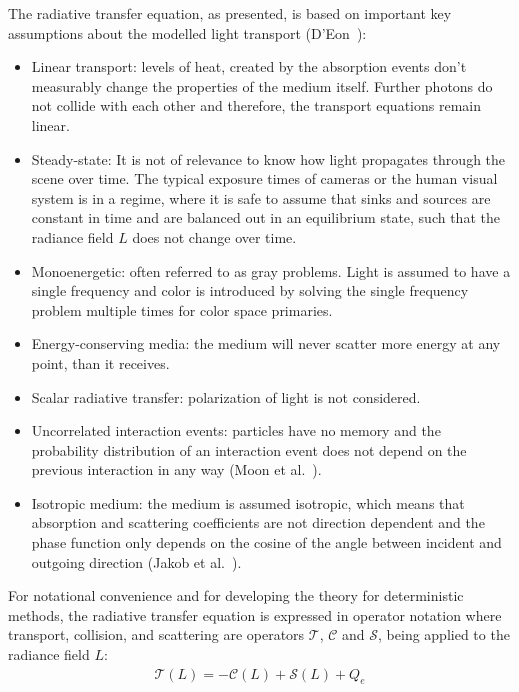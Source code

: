 The radiative transfer equation, as presented, is based on important key assumptions about the modelled light transport (D'Eon~\cite{DEon14}):
\begin{itemize}
\item Linear transport: levels of heat, created by the absorption events don't measurably change the properties of the medium itself. Further photons do not collide with each other and therefore, the transport equations remain linear.
\item Steady-state: It is not of relevance to know how light propagates through the scene over time. The typical exposure times of cameras or the human visual system is in a regime, where it is safe to assume that sinks and sources are constant in time and are balanced out in an equilibrium state, such that the radiance field $L$ does not change over time.
\item Monoenergetic: often referred to as gray problems. Light is assumed to have a single frequency and color is introduced by solving the single frequency problem multiple times for color space primaries.
\item Energy-conserving media: the medium will never scatter more energy at any point, than it receives.
\item Scalar radiative transfer: polarization of light is not considered.
\item Uncorrelated interaction events: particles have no memory and the probability distribution of an interaction event does not depend on the previous interaction in any way (Moon et al.~\cite{Moon07}).
\item Isotropic medium: the medium is assumed isotropic, which means that absorption and scattering coefficients are not direction dependent and the phase function only depends on the cosine of the angle between incident and outgoing direction (Jakob et al.~\cite{Jakob10}).
\end{itemize}

For notational convenience and for developing the theory for deterministic methods, the radiative transfer equation is expressed in operator notation where transport, collision, and scattering are operators $\mathcal{T}$, $\mathcal{C}$ and $\mathcal{S}$, being applied to the radiance field $L$:
\begin{align}
\mathcal{T}\left(L\right) = -\mathcal{C}\left(L\right) + \mathcal{S}\left(L\right) + Q_e
\label{eq:rte_operator_notation}
\end{align}

